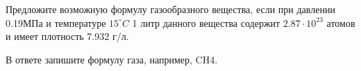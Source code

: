 
Предложите
возможную формулу газообразного вещества, если при
давлении 0.19МПа и температуре $15^{\circ}C$ 1 литр данного вещества содержит $2.87 \cdot 10^{23}$ атомов 
и имеет плотность 7.932 г/л. 

В ответе запишите формулу газа, например, CH4.

